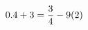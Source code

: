 \documentclass[preview]{standalone}
\begin{document}
\begin{align*}
\special{dvisvgm:raw <g id='unique000'>}0.4 + 3 = \frac{3}{4} - 9(2)\special{dvisvgm:raw </g>}
\end{align*}
\end{document}
